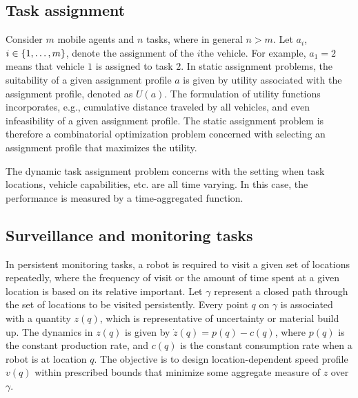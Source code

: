 \subsection{Task assignment}
Consider $m$ mobile agents and $n$ tasks, where in general $n > m$. Let $a_i$, $i \in \{1,\dots,m\}$, denote the assignment of the $i$the vehicle. For example, $a_1=2$ means that vehicle $1$ is assigned to task $2$. In static assignment problems, the suitability of a given assignment profile $a$ is given by utility associated with the assignment profile, denoted as $U(a)$. The formulation of utility functions incorporates, e.g., cumulative distance traveled by all vehicles, and even infeasibility of a given assignment profile. The static assignment problem is therefore a combinatorial optimization problem concerned with selecting an assignment profile that maximizes the utility.  

The dynamic task assignment problem concerns with the setting when task locations, vehicle capabilities, etc. are all time varying. In this case, the performance is measured by a time-aggregated function.  

\subsection{Surveillance and monitoring tasks}
In persistent monitoring tasks, a robot is required to visit a given set of locations repeatedly, where the frequency of visit or the amount of time spent at a given location is based on its relative important. Let $\gamma$ represent a closed path through the set of locations to be visited persistently. Every point $q$ on $\gamma$ is associated with a quantity $z(q)$, which is representative of uncertainty or material build up. The dynamics in $z(q)$ is given by $\dot{z}(q)=p(q)-c(q)$, where $p(q)$ is the constant production rate, and $c(q)$ is the constant consumption rate when a robot is at location $q$. The objective is to design location-dependent speed profile $v(q)$ within prescribed bounds that minimize some aggregate measure of $z$ over $\gamma$.












